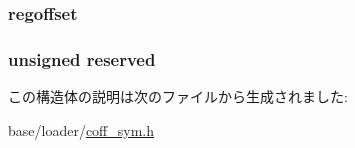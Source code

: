 \label{structpdr_a483285303cfea098d3714bb87f10ffab}
\hypertarget{structpdr_a00dcff15b999ec73eec85e2ebc34a6a8}{
\subsubsection[{regoffset}]{ {\bf regoffset}}}
\label{structpdr_a00dcff15b999ec73eec85e2ebc34a6a8}
\hypertarget{structpdr_a6a6017ea077b575677a11d733ec137a3}{
\subsubsection[{reserved}]{\setlength{\rightskip}{0pt plus 5cm}unsigned {\bf reserved}}}
\label{structpdr_a6a6017ea077b575677a11d733ec137a3}


この構造体の説明は次のファイルから生成されました:\begin{DoxyCompactItemize}
\item 
base/loader/\hyperlink{coff__sym_8h}{coff\_\-sym.h}\end{DoxyCompactItemize}
